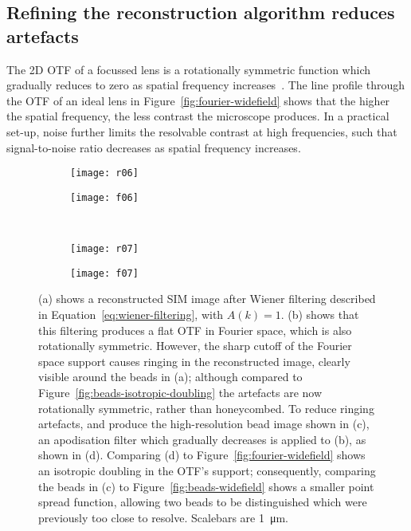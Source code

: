 \subsection{Refining the reconstruction algorithm reduces artefacts}
The 2D OTF of a focussed lens is a rotationally symmetric function which gradually reduces to zero as spatial frequency increases~\cite{williams2002introduction}. 
The line profile through the OTF of an ideal lens in Figure~\ref{fig:fourier-widefield} shows that the higher the spatial frequency, the less contrast the microscope produces.
In a practical set-up, noise further limits the resolvable contrast at high frequencies, such that signal-to-noise ratio decreases as spatial frequency increases. 

\begin{figure}[tbp]
\vspace{-6pt} \centering
\begin{subfigure}[b]{0.45\textwidth}
	\texttt{[image: r06]}
	\caption{}\label{fig:beads-wiener}
\end{subfigure}
\raisebox{9.3em}{\noindent\Huge$\Leftrightarrow$}
\begin{subfigure}[b]{0.45\textwidth}
	\texttt{[image: f06]}
	\caption{}\label{fig:fourier-wiener}
\end{subfigure}

~\newline
\begin{subfigure}[b]{0.45\textwidth}
	\texttt{[image: r07]}
	\caption{}\label{fig:beads-apodised}
\end{subfigure}
\raisebox{9.3em}{\noindent\Huge$\Leftrightarrow$}
\begin{subfigure}[b]{0.45\textwidth}
	\texttt{[image: f07]}
	\caption{}\label{fig:fourier-apodised}
\end{subfigure}
\caption[LAG SIM: Wiener filtering of the SIM OTF is required for artefact-free reconstruction]{(a) shows a reconstructed SIM image after Wiener filtering described in Equation~\ref{eq:wiener-filtering}, with $A\left(k\right) = 1$. 
(b) shows that this filtering produces a flat OTF in Fourier space, which is also rotationally symmetric. 
However, the sharp cutoff of the Fourier space support causes ringing in the reconstructed image, clearly visible around the beads in (a); although compared to Figure~\ref{fig:beads-isotropic-doubling} the artefacts are now rotationally symmetric, rather than honeycombed. 
To reduce ringing artefacts, and produce the high-resolution bead image shown in (c), an apodisation filter which gradually decreases is applied to (b), as shown in (d). 
Comparing (d) to Figure~\ref{fig:fourier-widefield} shows an isotropic doubling in the OTF's support; consequently, comparing the beads in (c) to Figure~\ref{fig:beads-widefield} shows a smaller point spread function, allowing two beads to be distinguished which were previously too close to resolve. Scalebars are \SI{1}{\micro\metre}.} 
\label{fig:sim-OTFs}
\end{figure}


